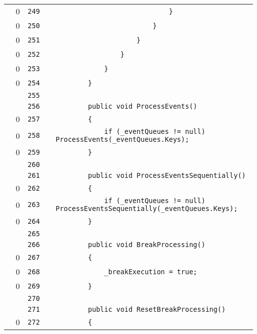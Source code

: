 \documentclass[a4paper,landscape,10pt]{article}
\begin{document}
\begin{longtable}[l]{lrrll}
\cellcolor{red} & 0 & \verb~249~ & & \verb~                            }~\\
\cellcolor{red} & 0 & \verb~250~ & & \verb~                        }~\\
\cellcolor{red} & 0 & \verb~251~ & & \verb~                    }~\\
\cellcolor{red} & 0 & \verb~252~ & & \verb~                }~\\
\cellcolor{red} & 0 & \verb~253~ & & \verb~            }~\\
\cellcolor{red} & 0 & \verb~254~ & & \verb~        }~\\
\cellcolor{gray} &  & \verb~255~ & & \verb~~\\
\cellcolor{gray} &  & \verb~256~ & & \verb~        public void ProcessEvents()~\\
\cellcolor{red} & 0 & \verb~257~ & & \verb~        {~\\
\cellcolor{red} & 0 & \verb~258~ & & \verb~            if (_eventQueues != null) ProcessEvents(_eventQueues.Keys);~\\
\cellcolor{red} & 0 & \verb~259~ & & \verb~        }~\\
\cellcolor{gray} &  & \verb~260~ & & \verb~~\\
\cellcolor{gray} &  & \verb~261~ & & \verb~        public void ProcessEventsSequentially()~\\
\cellcolor{red} & 0 & \verb~262~ & & \verb~        {~\\
\cellcolor{red} & 0 & \verb~263~ & & \verb~            if (_eventQueues != null) ProcessEventsSequentially(_eventQueues.Keys);~\\
\cellcolor{red} & 0 & \verb~264~ & & \verb~        }~\\
\cellcolor{gray} &  & \verb~265~ & & \verb~~\\
\cellcolor{gray} &  & \verb~266~ & & \verb~        public void BreakProcessing()~\\
\cellcolor{red} & 0 & \verb~267~ & & \verb~        {~\\
\cellcolor{red} & 0 & \verb~268~ & & \verb~            _breakExecution = true;~\\
\cellcolor{red} & 0 & \verb~269~ & & \verb~        }~\\
\cellcolor{gray} &  & \verb~270~ & & \verb~~\\
\cellcolor{gray} &  & \verb~271~ & & \verb~        public void ResetBreakProcessing()~\\
\cellcolor{red} & 0 & \verb~272~ & & \verb~        {~\\

\end{longtable}
\end{document}
